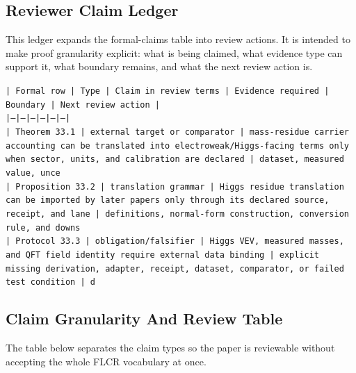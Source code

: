\documentclass[11pt]{article}
\begin{document}
\subsection*{Reviewer Claim Ledger}

This ledger expands the formal-claims table into review actions. It is intended to make proof granularity explicit: what is being claimed, what evidence type can support it, what boundary remains, and what the next review action is.

\noindent\texttt{| Formal row | Type | Claim in review terms | Evidence required | Boundary | Next review action |}\\
\noindent\texttt{|---|---|---|---|---|---|}\\
\noindent\texttt{| Theorem 33.1 | external target or comparator | mass-residue carrier accounting can be translated into electroweak/Higgs-facing terms only when sector, units, and calibration are declared | dataset, measured value, unce}\\
\noindent\texttt{| Proposition 33.2 | translation grammar | Higgs residue translation can be imported by later papers only through its declared source, receipt, and lane | definitions, normal-form construction, conversion rule, and downs}\\
\noindent\texttt{| Protocol 33.3 | obligation/falsifier | Higgs VEV, measured masses, and QFT field identity require external data binding | explicit missing derivation, adapter, receipt, dataset, comparator, or failed test condition | d}\\

\subsection*{Claim Granularity And Review Table}

The table below separates the claim types so the paper is reviewable without accepting the whole FLCR vocabulary at once.
\end{document}
